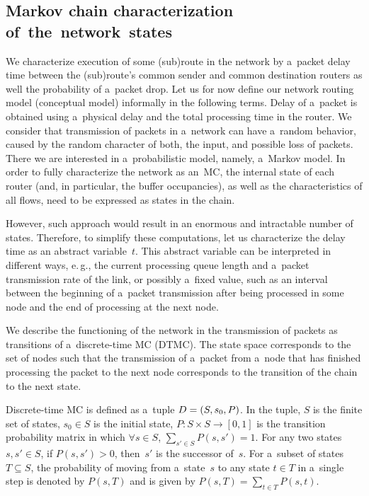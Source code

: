 \begin{multicols}{2}
\subsection{Markov chain characterization of~the~network~states}

\noindent
We characterize execution of some (sub)route in the network by 
a~packet delay time between the (sub)route's common sender and common destination 
routers as well the probability of a~packet drop. Let us for now define our 
network routing model (conceptual model) informally in the following terms. 
Delay of a~packet is obtained using a~physical delay and the total processing 
time in the router. We consider that transmission of packets in 
a~network can have a~random behavior, caused by the random character of both, 
the input, and possible loss of packets. There we are interested in 
a~probabilistic model, namely, a~Markov model. In order to fully characterize 
the network as an~MC, the internal state of each router 
(and, in particular, the buffer occupancies), as well as the characteristics
 of all flows, need to be expressed as states in the chain. 

However, such approach would result in an enormous and intractable number of states. 
Therefore, to simplify these computations, let us characterize the delay time as 
an abstract variable~$t$. This abstract variable can be interpreted in different ways, 
e.\,g., the current processing queue length and a~packet transmission rate of the link, 
or possibly a~fixed value, such as an interval between the beginning of 
a~packet transmission after being processed in some node and the end of processing 
at the next node. 

We describe the functioning of the network in the transmission of packets 
as transitions of a~discrete-time MC (DTMC). The state space corresponds to the set 
of nodes such that 
the transmission of a~packet from a~node that has finished processing the packet 
to the next node corresponds to the transition of the chain to the next state.


Discrete-time MC is defined as a~tuple $D\linebreak =(S, s_0, P)$. In the tuple, $S$ is 
the finite set of states, $s_0\in S$ is the initial
state, $P:S \times S \rightarrow [0, 1]$ is the transition probability matrix in 
which $\forall s\in S$, $\sum\nolimits_{s' \in S} P(s,s') = 1$. 
For any two states $s, s' \in S$, if $P(s,s')>0$, then~$s'$ is the successor of~$s$. 
For a~subset of states $T \subseteq S$, the probability of moving from a~state~$s$ 
to any state $t \in T$ in a~single step is denoted by $P(s, T)$ and is given by 
$P(s,T)=\sum\nolimits_{t \in T} P(s, t)$. 


\end{multicols}
